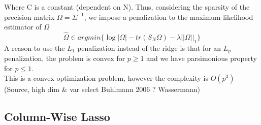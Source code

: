 Where C is a constant (dependent on N). Thus, considering the sparsity of the precision matrix $\Omega=\Sigma^{-1}$, we impose a penalization to the maximum likelihood estimator of $\Omega$
\begin{equation}
\hat\Omega\in argmin\big\{ \log|\Omega|-tr(S_N\Omega)-\lambda||\Omega||_1   \big\}
\end{equation}
A reason to use the $L_1$ penalization instead of the ridge is that for an $L_p$ penalization, the problem is convex for $p\geq 1$ and we have parsimonious property for $p\leq 1$.\\
This is a convex optimization problem, however the complexity is $O(p^3)$ (Source, high dim \& var select Buhlmann 2006 ? Wassermann)
\subsection{Column-Wise Lasso}

